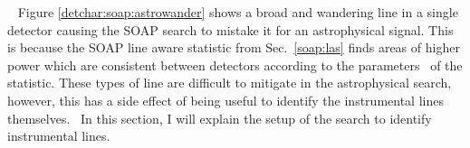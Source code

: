 %
~ Figure
\ref{detchar:soap:astrowander} shows a broad and wandering line in a single
detector causing the SOAP search to mistake it for an astrophysical signal.
This is because the SOAP line aware statistic from Sec.~\ref{soap:las} finds
areas of higher power which are consistent between detectors according to the
parameters~ of the
statistic. These types of line are difficult to mitigate in the astrophysical
search, however, this has a side effect of being useful to identify the
instrumental lines themselves.~
In this section, I will explain the setup of the search to identify
instrumental lines.

